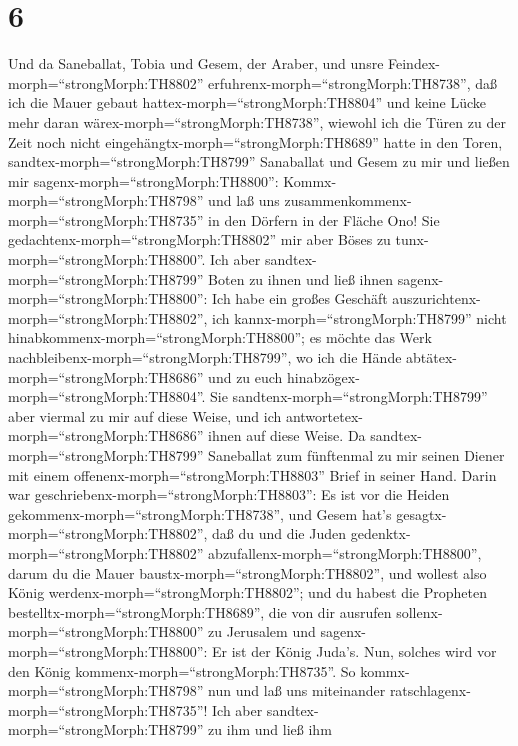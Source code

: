 \hypertarget{section-5}{%
\section{6}\label{section-5}}

 Und da Saneballat, Tobia und Gesem, der Araber, und unsre
Feindex-morph=``strongMorph:TH8802''
erfuhrenx-morph=``strongMorph:TH8738'', daß ich die Mauer gebaut
hattex-morph=``strongMorph:TH8804'' und keine Lücke mehr daran
wärex-morph=``strongMorph:TH8738'', wiewohl ich die Türen zu der Zeit
noch nicht eingehängtx-morph=``strongMorph:TH8689'' hatte in den Toren,
 sandtex-morph=``strongMorph:TH8799'' Sanaballat und Gesem
zu mir und ließen mir sagenx-morph=``strongMorph:TH8800'':
Kommx-morph=``strongMorph:TH8798'' und laß uns
zusammenkommenx-morph=``strongMorph:TH8735'' in den Dörfern in der
Fläche Ono! Sie gedachtenx-morph=``strongMorph:TH8802'' mir aber Böses
zu tunx-morph=``strongMorph:TH8800''.  Ich aber
sandtex-morph=``strongMorph:TH8799'' Boten zu ihnen und ließ ihnen
sagenx-morph=``strongMorph:TH8800'': Ich habe ein großes Geschäft
auszurichtenx-morph=``strongMorph:TH8802'', ich
kannx-morph=``strongMorph:TH8799'' nicht
hinabkommenx-morph=``strongMorph:TH8800''; es möchte das Werk
nachbleibenx-morph=``strongMorph:TH8799'', wo ich die Hände
abtätex-morph=``strongMorph:TH8686'' und zu euch
hinabzögex-morph=``strongMorph:TH8804''.  Sie
sandtenx-morph=``strongMorph:TH8799'' aber viermal zu mir auf diese
Weise, und ich antwortetex-morph=``strongMorph:TH8686'' ihnen auf diese
Weise.  Da sandtex-morph=``strongMorph:TH8799'' Saneballat
zum fünftenmal zu mir seinen Diener mit einem
offenenx-morph=``strongMorph:TH8803'' Brief in seiner Hand. 
Darin war geschriebenx-morph=``strongMorph:TH8803'': Es ist vor die
Heiden gekommenx-morph=``strongMorph:TH8738'', und Gesem hat's
gesagtx-morph=``strongMorph:TH8802'', daß du und die Juden
gedenktx-morph=``strongMorph:TH8802''
abzufallenx-morph=``strongMorph:TH8800'', darum du die Mauer
baustx-morph=``strongMorph:TH8802'', und wollest also König
werdenx-morph=``strongMorph:TH8802'';  und du habest die
Propheten bestelltx-morph=``strongMorph:TH8689'', die von dir ausrufen
sollenx-morph=``strongMorph:TH8800'' zu Jerusalem und
sagenx-morph=``strongMorph:TH8800'': Er ist der König Juda's. Nun,
solches wird vor den König kommenx-morph=``strongMorph:TH8735''. So
kommx-morph=``strongMorph:TH8798'' nun und laß uns miteinander
ratschlagenx-morph=``strongMorph:TH8735''!  Ich aber
sandtex-morph=``strongMorph:TH8799'' zu ihm und ließ ihm
